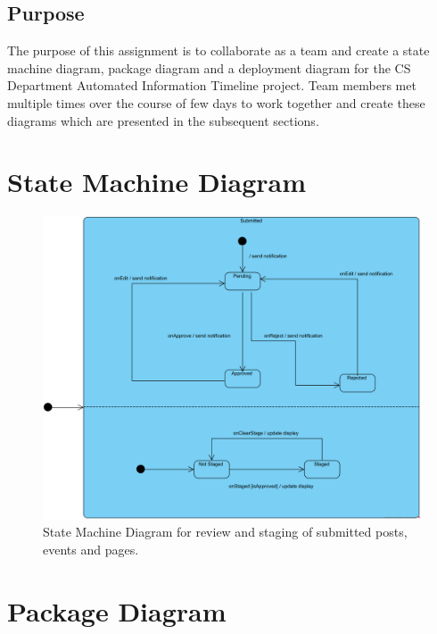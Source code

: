
\subsection{Purpose}
The purpose of this assignment is to collaborate as a team and create a state machine diagram, package diagram and a deployment diagram for the CS Department Automated Information Timeline project. Team members met multiple times over the course of few days to work together and create these diagrams which are presented in the subsequent sections.

\section{State Machine Diagram}

\begin{figure}[H]
    \centering
    \includegraphics[width=.98\textwidth]{images/State_Machine_Diagram.png}
    \centering
    \caption{State Machine Diagram for review and staging of submitted posts, events and pages.}
\end{figure}

\section{Package Diagram}

